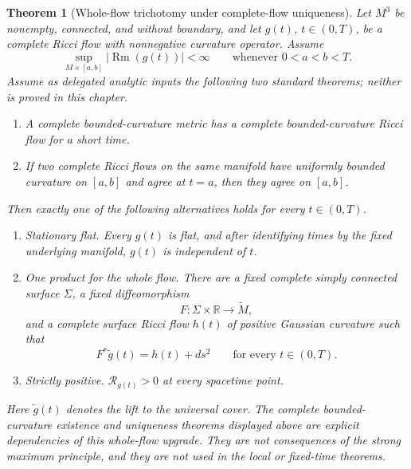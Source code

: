 \documentclass[10pt]{coll-l}
\newcommand{\R}{\mathbb{R}}
\newtheorem{theorem}{Theorem}[chapter]
\theoremstyle{definition}
\theoremstyle{remark}
\numberwithin{section}{chapter}
\numberwithin{equation}{chapter}
\newcommand{\Rm}{\operatorname{Rm}}
\begin{document}
\begin{theorem}[Whole-flow trichotomy under complete-flow uniqueness]
\label{thm:curvature-spacetime-trichotomy}
Let $M^3$ be nonempty, connected, and without boundary, and let $g(t)$,
$t\in(0,T)$, be a complete Ricci flow with nonnegative curvature operator.
Assume
\begin{equation}
  \sup_{M\times[a,b]}|\Rm(g(t))|<\infty
       \qquad\text{whenever }0<a<b<T.                    \label{eq:smp-compact-slab-bound}
\end{equation}
Assume as delegated analytic inputs the following two standard theorems;
neither is proved in this chapter.
\begin{enumerate}
\item A complete bounded-curvature metric has a complete
      bounded-curvature Ricci flow for a short time.
\item If two complete Ricci flows on the same manifold have uniformly
      bounded curvature on $[a,b]$ and agree at $t=a$, then they agree on
      $[a,b]$.
\end{enumerate}
Then exactly one of the following alternatives holds for every
$t\in(0,T)$.
\begin{enumerate}
\item \emph{Stationary flat.}  Every $g(t)$ is flat, and after identifying
      times by the fixed underlying manifold, $g(t)$ is independent of $t$.
\item \emph{One product for the whole flow.}  There are a fixed complete
      simply connected surface $\Sigma$, a fixed diffeomorphism
      \[
                       F\colon\Sigma\times\R\longrightarrow\widetilde M,
      \]
      and a complete surface Ricci flow $h(t)$ of positive Gaussian
      curvature such that
      \begin{equation}
            F^*\widetilde g(t)=h(t)+ds^2
            \qquad\text{for every }t\in(0,T).             \label{eq:smp-whole-flow-product}
      \end{equation}
\item \emph{Strictly positive.}
      $\mathcal R_{g(t)}>0$ at every spacetime point.
\end{enumerate}
Here $\widetilde g(t)$ denotes the lift to the universal cover.  The
complete bounded-curvature existence and uniqueness theorems displayed
above are explicit dependencies of this whole-flow upgrade.  They are not
consequences of the strong maximum principle, and they are not used in the
local or fixed-time theorems.
\end{theorem}
\end{document}
